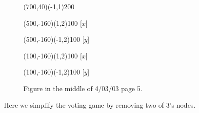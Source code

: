 \documentclass[12pt]{article}
\newcommand{\n}{\noindent}
\newcommand{\s}{\vspace{5mm}}
\begin{document}
\begin{figure}[htb]
\begin{egame}
\putbranch(700,40)(-1,1){200}




\renewcommand{\egarrowstyle}{}

\putbranch(500,-160)(1,2){100}
[$x$]

\renewcommand{\egarrowstyle}{}

\putbranch(500,-160)(-1,2){100}
[$y$]

\renewcommand{\egarrowstyle}{}

\putbranch(100,-160)(1,2){100}
[$x$]

\renewcommand{\egarrowstyle}{}

\putbranch(100,-160)(-1,2){100}
[$y$]

%
\end{egame}
\hspace*{\fill}\s\s\s\s\s\s\s\s\s
\caption[]{Figure in the middle of 4/03/03 page 5.}\label{f:five}
\end{figure}

\n Here we simplify the voting game by removing two of $3$'s nodes.
\end{document}
